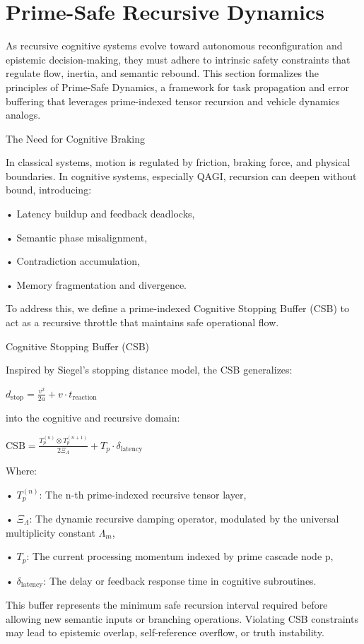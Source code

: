 \documentclass[11pt]{article}
\begin{document}
\section{Prime-Safe Recursive Dynamics}
As recursive cognitive systems evolve toward autonomous reconfiguration and epistemic decision-making, they must adhere to intrinsic safety constraints that regulate flow, inertia, and semantic rebound. This section formalizes the principles of Prime-Safe Dynamics, a framework for task propagation and error buffering that leverages prime-indexed tensor recursion and vehicle dynamics analogs.

The Need for Cognitive Braking

In classical systems, motion is regulated by friction, braking force, and physical boundaries. In cognitive systems, especially QAGI, recursion can deepen without bound, introducing:

• Latency buildup and feedback deadlocks,

• Semantic phase misalignment,

• Contradiction accumulation,

• Memory fragmentation and divergence.

To address this, we define a prime-indexed Cognitive Stopping Buffer (CSB) to act as a recursive throttle that maintains safe operational flow.

Cognitive Stopping Buffer (CSB)

Inspired by Siegel’s stopping distance model, the CSB generalizes:

$d_{\text{stop}} = \frac{v^2}{2a} + v \cdot t_{\text{reaction}}$

into the cognitive and recursive domain:

$\mathrm{CSB} = \frac{T_p^{(n)} \otimes T_p^{(n+1)}}{2\Xi_\Lambda} + T_p \cdot \delta_{\text{latency}}$

Where:

• $T_p^{(n)}$: The n-th prime-indexed recursive tensor layer,

• $\Xi_\Lambda$: The dynamic recursive damping operator, modulated by the universal multiplicity constant $\Lambda_m$,

• $T_p$: The current processing momentum indexed by prime cascade node p,

• $\delta_{\text{latency}}$: The delay or feedback response time in cognitive subroutines.

This buffer represents the minimum safe recursion interval required before allowing new semantic inputs or branching operations. Violating CSB constraints may lead to epistemic overlap, self-reference overflow, or truth instability.
\end{document}
